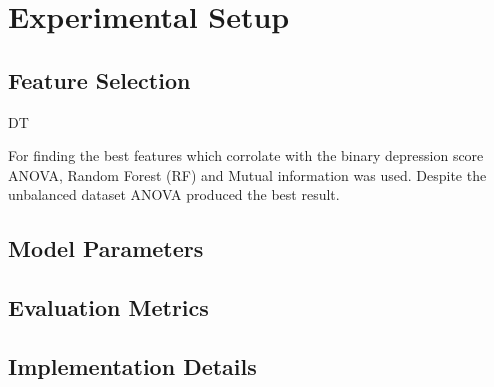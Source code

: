 \section{Experimental Setup}
\subsection{Feature Selection}

DT

For finding the best features which corrolate with the binary depression score ANOVA, Random Forest (RF) and Mutual information was used. Despite the unbalanced dataset ANOVA produced the best result. 
\subsection{Model Parameters}
\subsection{Evaluation Metrics}
\subsection{Implementation Details}